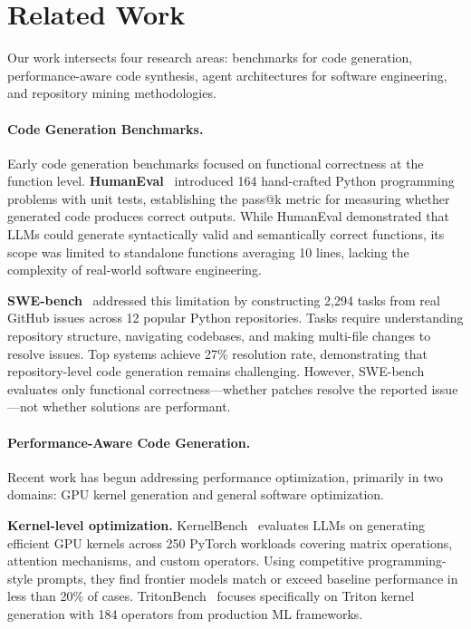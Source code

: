 \documentclass{article}
\theoremstyle{plain}
\theoremstyle{definition}
\theoremstyle{remark}
\begin{document}
\section{Related Work}
\label{sec:related}

Our work intersects four research areas: benchmarks for code generation, performance-aware code synthesis, agent architectures for software engineering, and repository mining methodologies.

\paragraph{Code Generation Benchmarks.}
Early code generation benchmarks focused on functional correctness at the function level.
\textbf{HumanEval}~\citep{chen2021evaluating} introduced 164 hand-crafted Python programming problems with unit tests, establishing the pass@k metric for measuring whether generated code produces correct outputs. While HumanEval demonstrated that LLMs could generate syntactically valid and semantically correct functions, its scope was limited to standalone functions averaging 10 lines, lacking the complexity of real-world software engineering.

\textbf{SWE-bench}~\citep{jimenez2023swe} addressed this limitation by constructing 2,294 tasks from real GitHub issues across 12 popular Python repositories. Tasks require understanding repository structure, navigating codebases, and making multi-file changes to resolve issues. Top systems achieve 27\% resolution rate, demonstrating that repository-level code generation remains challenging. However, SWE-bench evaluates only functional correctness---whether patches resolve the reported issue---not whether solutions are performant.

\paragraph{Performance-Aware Code Generation.}
Recent work has begun addressing performance optimization, primarily in two domains: GPU kernel generation and general software optimization.

\textbf{Kernel-level optimization.} KernelBench~\citep{ouyang2025kernelbench} evaluates LLMs on generating efficient GPU kernels across 250 PyTorch workloads covering matrix operations, attention mechanisms, and custom operators. Using competitive programming-style prompts, they find frontier models match or exceed baseline performance in less than 20\% of cases. TritonBench~\citep{li2025tritonbench} focuses specifically on Triton kernel generation with 184 operators from production ML frameworks.
\end{document}
